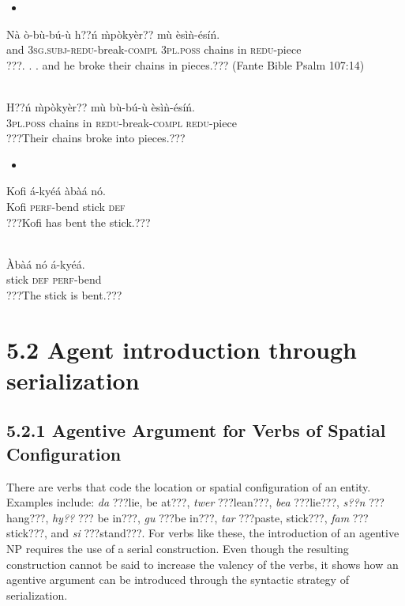\documentclass[output=paper]{langsci/langscibook}
\begin{document}
\begin{itemize}
\item \ea\label{ex:}
\\
\end{itemize}
\gll N\`{a}  \`{o}-b\`{u}-b\'{u}-\`{u}      h??\'{n}    \`{m}p\`{o}ky\`{e}r??  m\`{u}   \`{e}s\`{i}\`{n}-\'{e}s\'{i}\'{n}.\\
     and  \textsc{3sg.subj}{}-\textsc{redu}{}-break-\textsc{compl}  \textsc{3pl.poss}  chains    in  \textsc{redu}{}-piece\\
\glt ???. . . and he broke their chains in pieces.??? (Fante Bible Psalm 107:14)
\z

\ea\label{ex:}
\\
\gll H??\'{n}  \`{m}p\`{o}ky\`{e}r??   m\`{u}  b\`{u}-b\'{u}-\`{u}     \`{e}s\`{i}\`{n}-\'{e}s\'{i}\'{n}.\\
     \textsc{3pl.poss}  chains    in  \textsc{redu}{}-break-\textsc{compl}  \textsc{redu}{}-piece\\
\glt ???Their chains broke into pieces.???
\z

\begin{itemize}
\item \ea\label{ex:}
\\
\end{itemize}
\gll Kofi  \'{a}-ky\'{e}\'{a}    \`{a}b\`{a}\'{a}  n\'{o}.\\
     Kofi  \textsc{perf}{}-bend  stick  \textsc{def}\\
\glt ???Kofi has bent the stick.???
\z

\ea\label{ex:}
\\
\gll \`{A}b\`{a}\'{a}  n\'{o}  \'{a}-ky\'{e}\'{a}.\\
     stick  \textsc{def}  \textsc{perf}{}-bend\\
\glt ???The stick is bent.???
\z

\section{5.2  Agent introduction through serialization}
\subsection{5.2.1  Agentive Argument for Verbs of Spatial Configuration}

There are verbs that code the location or spatial configuration of an entity. Examples  include: \emph{da} ???lie, be at???, \emph{twer} ???lean???, \emph{bea} ???lie???, \emph{s??n} ???hang???, \emph{hy??} ??? be in???, \emph{gu} ???be in???, \emph{tar} ???paste, stick???, \emph{fam} ???stick???, and \emph{si} ???stand???. For verbs like these, the introduction of an agentive NP requires the use of a serial construction. Even though the resulting construction cannot be said to increase the valency of the verbs, it shows how an agentive argument can be introduced through the syntactic strategy of serialization.
\end{document}
